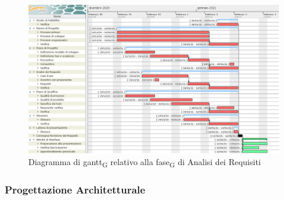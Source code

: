 \begin{figure}[H]
	\centering
	\includegraphics[scale=0.45]{res/images/02_gantt_analisi_requisiti.png}
	\caption{Diagramma di gantt\textsubscript{G} relativo alla fase\textsubscript{G} di Analisi dei Requisiti}
\end{figure}


\subsubsection{Progettazione Architetturale}

